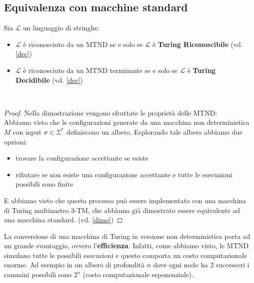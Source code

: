 \subsection{Equivalenza con macchine standard}
\colorbox{SALZO}{\parbox{\dimexpr\linewidth-2\fboxsep}{\begin{theorem}
   Sia $\mathcal{L}$ un linguaggio di stringhe:
   \begin{itemize}
    \item $\mathcal{L}$ è riconosciuto da un MTND se e solo se $\mathcal{L}$ è \textbf{Turing Riconoscibile} (vd. \ref{dec})
    \item $\mathcal{L}$ è riconosciuto da un MTND terminante se e solo se $\mathcal{L}$ è \textbf{Turing Decidibile} (vd. \ref{dec})
   \end{itemize}
\end{theorem}}}\smallskip\\
\begin{proof}
    Nella dimostrazione vengono sfruttate le proprietà delle MTND:\\
    Abbiamo visto che le configurazioni generate da una macchina non deterministica $M$
    con input $\sigma \in \Sigma^*$ definiscono un albero. Esplorando tale albero abbiamo due opzioni:
    \begin{itemize}[label=--]
        \item trovare la configurazione accettante se esiste
        \item rifiutare se non esiste una configurazione accettante e tutte le esecuzioni possibili sono finite
    \end{itemize}
    E abbiamo visto che questo processo può essere implementato con una macchina di Turing multinastro 3-TM, che abbiamo già dimostrato essere equivalente 
    ad una macchina standard. (vd. \ref{dimo})
\end{proof}

\noindent La conversione di una macchina di Turing in versione non deterministica porta ad un grande svantaggio, ovvero l'\textbf{efficienza}.
Infatti, come abbiamo visto, le MTND simulano tutte le possibili esecuzioni e questo comporta un costo computazionale enorme.
Ad esempio in un albero di profondità $n$ dove ogni nodo ha 2 successori i cammini possibili sono $2^n$ (costo computazionale esponenziale).



